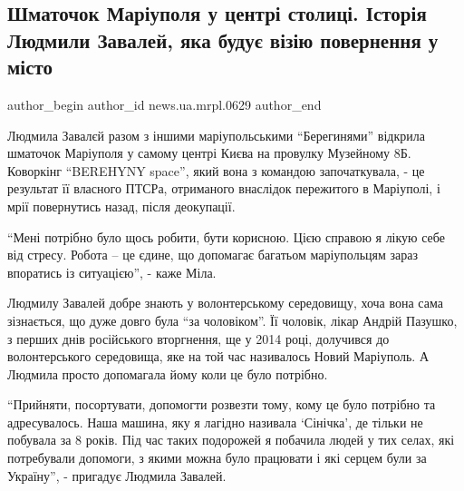  
 
 
 
 
 
\subsection{Шматочок Маріуполя у центрі столиці. Історія Людмили Завалей, яка будує візію повернення у місто}
\label{sec:10_08_2023.stz.news.ua.mrpl.0629.1.ljudmyla_zavalej}
 
\ifcmt
 author_begin
   author_id news.ua.mrpl.0629
 author_end
\fi

\begin{qqquote}
Людмила Завалєй разом з іншими маріупольськими \enquote{Берегинями} відкрила шматочок
Маріуполя у самому центрі Києва на провулку Музейному 8Б. Коворкінг
\enquote{BEREHYNY space}, який вона з командою започаткувала,  - це результат
її власного ПТСРа, отриманого внаслідок пережитого в Маріуполі, і мрії
повернутись назад, після деокупації. 
\end{qqquote}

\enquote{Мені потрібно було щось робити, бути корисною. Цією справою я лікую себе від
стресу. Робота – це єдине, що допомагає багатьом маріупольцям зараз впоратись
із ситуацією}, - каже Міла.


Людмилу Завалей добре знають у волонтерському середовищу, хоча вона сама
зізнається, що дуже довго була \enquote{за чоловіком}. Її чоловік, лікар Андрій
Пазушко, з перших днів російського вторгнення, ще у 2014 році, долучився  до
волонтерського середовища, яке на той час називалось Новий Маріуполь. А Людмила
просто допомагала йому коли це було потрібно. 

\enquote{Прийняти, посортувати,  допомогти розвезти тому, кому це було потрібно та
адресувалось. Наша машина, яку я лагідно називала  \enquote{Сінічка}, де тільки не
побувала за 8 років. Під час таких подорожей я побачила людей у тих селах, які
потребували допомоги, з якими можна було працювати і які серцем були за
Україну}, - пригадує Людмила Завалей.

